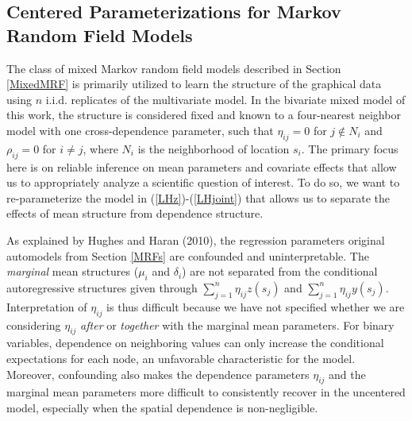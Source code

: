 \documentclass[12pt, a4paper, twoside]{article}
\begin{document}
 
\subsection{Centered Parameterizations for Markov Random Field Models} \label{Centered}
The class of mixed Markov random field models described in Section \ref{MixedMRF} is primarily utilized to learn the structure of the graphical data using $n$ i.i.d. replicates of the multivariate model. In the bivariate mixed model of this work, the structure is considered fixed and known to a four-nearest neighbor model with one cross-dependence parameter, such that $\eta_{ij} = 0$ for $j \notin N_i$ and $\rho_{ij}=0$ for $i\neq j$, where $N_i$ is the neighborhood of location $s_i$. The primary focus here is on reliable inference on mean parameters and covariate effects that allow us to appropriately analyze a scientific question of interest. To do so, we want to re-parameterize the model in (\ref{LHz})-(\ref{LHjoint}) that allows us to separate the effects of mean structure from dependence structure.

As explained by Hughes and Haran (2010), the regression parameters original automodels from Section \ref{MRFs} are confounded and uninterpretable. The \textit{marginal} mean structures ($\mu_i$ and $\delta_i$) are not separated from the {conditional} autoregressive structures given through $\sum_{j=1}^{n}\eta_{ij}z(s_j)$ and $\sum_{j=1}^{n}\eta_{ij}y(s_j)$. Interpretation of $\eta_{ij}$ is thus difficult because we have not specified whether we are considering $\eta_{ij}$ \textit{after} or \textit{together} with the marginal mean parameters. For binary variables, dependence on neighboring values can only increase the conditional expectations for each node, an unfavorable characteristic for the model. Moreover, confounding also makes the dependence parameters $\eta_{ij}$ and the marginal mean parameters more difficult to consistently recover in the uncentered model, especially when the spatial dependence is non-negligible.
\end{document}
